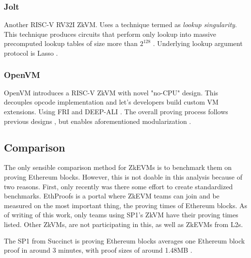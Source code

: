 \subsubsection*{Jolt}

Another RISC-V RV32I ZkVM. Uses a technique termed as \emph{lookup singularity}.
This technique produces circuits that perform only lookup into massive
precomputed lookup tables of size more than $2^{128}$ \cite{Jolt}. Underlying
lookup argument protocol is Lasso \cite{Lasso}.

\subsubsection*{OpenVM}

OpenVM introduces a RISC-V ZkVM with novel "no-CPU" design. This decouples
opcode implementation and let's developers build custom VM extensions. Using
FRI \cite{FRI} and DEEP-ALI \cite{DEEP-ALI}. The overall proving process follows
previous designs \cite{RISC0}, but enables aforementioned modularization \cite{OpenVM}.

\subsection{Comparison}

The only sensible comparison method for ZkEVMs is to benchmark them on proving
Ethereum blocks. However, this is not doable in this analysis because of two
reasons. First, only recently was there some effort to create standardized
benchmarks. EthProofs \cite{EthProofs} is a portal where ZkEVM teams can
join and be measured on the most important thing, the proving times of Ethereum
blocks. As of writing of this work, only teams using SP1's ZkVM have their
proving times listed. Other ZkVMs, are not participating in this, as well as
ZkEVMs from L2s.

The SP1 from Succinct is proving Ethereum blocks averages one Ethereum block proof
in around 3 minutes, with proof sizes of around 1.48MB \cite{EthProofs}.

